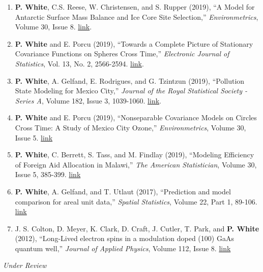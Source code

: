 \documentclass[12pt]{article}
\begin{document}
\begin{enumerate}[label=$\bullet$]
\item \textbf{P. White}, C.S. Reese, W. Christensen, and S. Rupper (2019), ``A Model for Antarctic Surface Mass Balance and Ice Core Site Selection,'' \emph{Environmetrics}, Volume 30, Issue 8. \href{https://onlinelibrary.wiley.com/doi/abs/10.1002/env.2579}{link}.
\item \textbf{P. White} and E. Porcu (2019), ``Towards a Complete Picture of Stationary Covariance Functions on Spheres Cross Time,'' \emph{Electronic Journal of Statistics}, Vol. 13, No. 2, 2566-2594. \href{https://doi.org/10.1214/19-EJS1593}{link}.
\item \textbf{P. White}, A. Gelfand, E. Rodrigues, and G. Tzintzun (2019), ``Pollution State Modeling for Mexico City,'' \emph{Journal of the Royal Statistical Society - Series A}, Volume 182, Issue 3, 1039-1060. \href{https://rss.onlinelibrary.wiley.com/doi/abs/10.1111/rssa.12444}{link}.
\item \textbf{P. White} and E. Porcu (2019), ``Nonseparable Covariance Models on Circles Cross Time: A Study of Mexico City Ozone,'' \emph{Environmetrics}, Volume 30, Issue 5. \href{https://onlinelibrary.wiley.com/doi/full/10.1002/env.2558}{link}
\item \textbf{P. White}, C. Berrett, S. Tass, and M. Findlay (2019), ``Modeling Efficiency of Foreign Aid Allocation in Malawi,'' \emph{The American Statistician}, Volume 30, Issue 5, 385-399.  \href{https://www.tandfonline.com/doi/full/10.1080/00031305.2018.1470032}{link}
\item \textbf{P. White}, A. Gelfand, and T. Utlaut (2017), ``Prediction and model comparison for areal unit data,'' \emph{Spatial Statistics}, Volume 22, Part 1, 89-106. \href{http://www.sciencedirect.com/science/article/pii/S2211675317301422}{link}
\item J. S. Colton, D. Meyer, K. Clark, D. Craft, J. Cutler, T. Park, and \textbf{P. White} (2012), ``Long-Lived electron spins in a modulation doped (100) GaAs quantum well,'' \emph{Journal of Applied Physics}, Volume 112, Issue 8.  \href{http://aip.scitation.org/doi/abs/10.1063/1.4759320}{link}
\end{enumerate}

\emph{Under Review}
\end{document}
